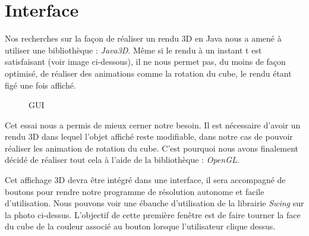\chapter{Interface}
Nos recherches sur la façon de réaliser un rendu 3D en Java nous a amené à utiliser une bibliothèque : \textit{Java3D}. Même si le rendu à un instant t est satisfaisant (voir image ci-dessous), il ne nous permet pas, du moins de façon optimisé, de réaliser des animations comme la rotation du cube, le rendu étant figé une fois affiché.
\begin{figure}[h]
\begin{center}
\end{center}
\caption{GUI}
\end{figure}
Cet essai nous a permis de mieux cerner notre besoin. Il est nécessaire d'avoir un rendu 3D dans lequel l'objet affiché reste modifiable, dans notre cas de pouvoir réaliser les animation de rotation du cube. C'est pourquoi nous avons finalement décidé de réaliser tout cela à l'aide de  la bibliothèque : \textit{OpenGL}.

Cet affichage 3D devra être intégré dans une interface, il sera accompagné de boutons pour rendre notre programme de résolution autonome et facile d'utilisation. Nous pouvons voir une ébauche d'utilisation de la librairie \textit{Swing} sur la photo ci-dessus. L'objectif de cette première fenêtre est de faire tourner la face du cube de la couleur associé au bouton lorsque l'utilisateur clique dessus.

